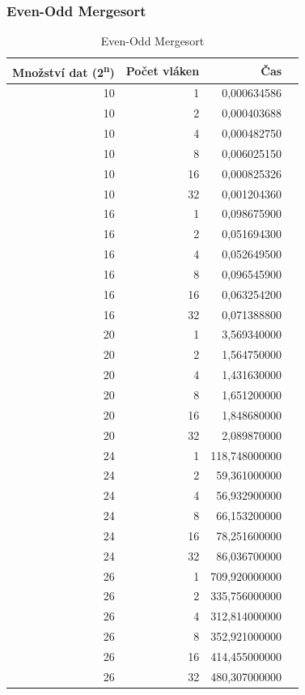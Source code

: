 \documentclass[12pt]{article}
\begin{document}
\subsubsection{Even-Odd Mergesort}
\begin{table}[H]
\begin{center}
\begin{tabular}{|r|r|r|r|}
\hline Množství dat (2\textsuperscript{n}) & Počet vláken & Čas \\ \hline
10 & 1  & 0,000634586 \\ \hline
10 & 2  & 0,000403688 \\ \hline
10 & 4  & 0,000482750 \\ \hline
10 & 8  & 0,006025150 \\ \hline
10 & 16 & 0,000825326 \\ \hline
10 & 32 & 0,001204360 \\ \hline
16 & 1  & 0,098675900 \\ \hline
16 & 2  & 0,051694300 \\ \hline
16 & 4  & 0,052649500 \\ \hline
16 & 8  & 0,096545900 \\ \hline
16 & 16 & 0,063254200 \\ \hline
16 & 32 & 0,071388800 \\ \hline
20 & 1  & 3,569340000 \\ \hline
20 & 2  & 1,564750000 \\ \hline
20 & 4  & 1,431630000 \\ \hline
20 & 8  & 1,651200000 \\ \hline
20 & 16 & 1,848680000 \\ \hline
20 & 32 & 2,089870000 \\ \hline
24 & 1  & 118,748000000 \\ \hline
24 & 2  & 59,361000000 \\ \hline
24 & 4  & 56,932900000 \\ \hline
24 & 8  & 66,153200000 \\ \hline
24 & 16 & 78,251600000 \\ \hline
24 & 32 & 86,036700000 \\ \hline
26 & 1  & 709,920000000 \\ \hline
26 & 2  & 335,756000000 \\ \hline
26 & 4  & 312,814000000 \\ \hline
26 & 8  & 352,921000000 \\ \hline
26 & 16 & 414,455000000 \\ \hline
26 & 32 & 480,307000000 \\ \hline
\end{tabular} 
\end{center}
\caption{Even-Odd Mergesort}
\end{table}
\end{document}
